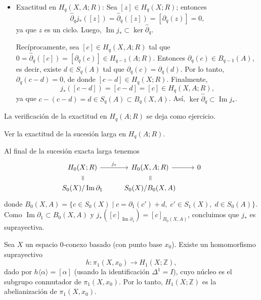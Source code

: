 \begin{dem}
\begin{itemize}
    \item {Exactitud en $H_q(X, A; R)$:} Sea $[z] \in H_q(X; R)$; entonces
    \[
    \hat{\partial}_q j_*([z]) = \hat{\partial}_q([z]) = [\partial_q(z)] = 0,
    \]
    ya que $z$ es un ciclo. Luego, $\operatorname{Im} j_* \subset \ker \hat{\partial}_q$.

    Recíprocamente, sea $[c] \in H_q(X, A; R)$ tal que $0 = \hat{\partial}_q([c]) = [\partial_q(c)] \in H_{q-1}(A; R)$. Entonces $\partial_q(c) \in B_{q-1}(A)$, es decir, existe $d \in S_q(A)$ tal que $\partial_q(c) = \partial_q(d)$. Por lo tanto, $\partial_q(c - d) = 0$, de donde $[c - d] \in H_q(X; R)$. Finalmente,
    \[
    j_*([c - d]) = [c - d] = [c] \in H_q(X, A; R),
    \]
    ya que $c - (c - d) = d \in S_q(A) \subset B_q(X, A)$. Así, $\ker \hat{\partial}_q \subset \operatorname{Im} j_*$.
\end{itemize}

La verificación de la exactitud en $H_q(A; R)$ se deja como ejercicio.
\end{dem}

\begin{ejercicio}
Ver la exactitud de la sucesión larga en $H_q(A; R)$.
\end{ejercicio}

\begin{nota}
Al final de la sucesión exacta larga tenemos
\[
\begin{tikzcd}[column sep=2.2em, row sep=1.2em]
H_0(X; R) \arrow[r, "j_*"] \arrow[d, phantom, "="{description, sloped, inner sep=1pt}] & H_0(X, A; R) \arrow[r] \arrow[d, phantom, "="{description, sloped, inner sep=1pt}] & 0 \\
S_0(X)/\operatorname{Im} \partial_1 & S_0(X)/B_0(X, A) &
\end{tikzcd}
\]
donde $B_0(X, A) = \{ c \in S_0(X) \mid c = \partial_1(c') + d, \; c' \in S_1(X), \; d \in S_0(A) \}$. Como $\operatorname{Im} \partial_1 \subset B_0(X, A)$ y $j_*([c]_{\operatorname{Im} \partial_1}) = [c]_{B_0(X, A)}$, concluimos que $j_*$ es suprayectiva.
\end{nota}

\begin{prop}[Hurewicz]
Sea $X$ un espacio $0$-conexo basado (con punto base $x_0$). Existe un homomorfismo suprayectivo
\[
h \colon \pi_1(X, x_0) \longrightarrow H_1(X; \mathbb{Z}),
\]
dado por $h\langle \alpha \rangle = [\alpha]$ (usando la identificación $\Delta^1 = I$), cuyo núcleo es el subgrupo conmutador de $\pi_1(X, x_0)$. Por lo tanto, $H_1(X; \mathbb{Z})$ es la abelianización de $\pi_1(X, x_0)$.
\end{prop}

